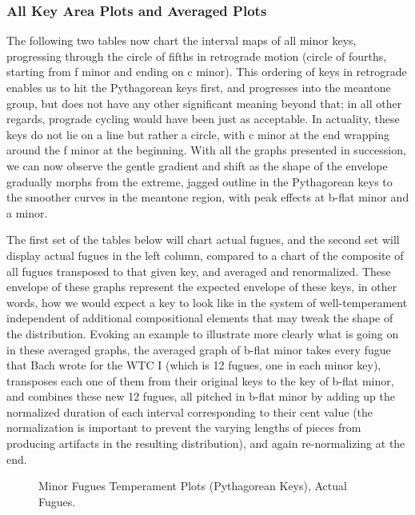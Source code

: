 \subsubsection{All Key Area Plots and Averaged
Plots}\label{all-key-area-plots-and-averaged-plots}

The following two tables now chart the interval maps of all minor keys,
progressing through the circle of fifths in retrograde motion (circle of
fourths, starting from f minor and ending on c minor). This ordering of
keys in retrograde enables us to hit the Pythagorean keys first, and
progresses into the meantone group, but does not have any other
significant meaning beyond that; in all other regards, prograde cycling
would have been just as acceptable. In actuality, these keys do not lie
on a line but rather a circle, with c minor at the end wrapping around
the f minor at the beginning. With all the graphs presented in
succession, we can now observe the gentle gradient and shift as the
shape of the envelope gradually morphs from the extreme, jagged outline
in the Pythagorean keys to the smoother curves in the meantone region,
with peak effects at b-flat minor and a minor.

The first set of the tables below will chart actual fugues, and the
second set will display actual fugues in the left column, compared to a
chart of the composite of all fugues transposed to that given key, and
averaged and renormalized. These envelope of these graphs represent the
expected envelope of these keys, in other words, how we would expect a
key to look like in the system of well-temperament independent of
additional compositional elements that may tweak the shape of the
distribution. Evoking an example to illustrate more clearly what is
going on in these averaged graphs, the averaged graph of b-flat minor
takes every fugue that Bach wrote for the WTC I (which is 12 fugues, one
in each minor key), transposes each one of them from their original keys
to the key of b-flat minor, and combines these new 12 fugues, all
pitched in b-flat minor by adding up the normalized duration of each
interval corresponding to their cent value (the normalization is
important to prevent the varying lengths of pieces from producing
artifacts in the resulting distribution), and again re-normalizing at
the end.



\begin{figure}[H]
    \begin{center}
    \caption{Minor Fugues Temperament Plots (Pythagorean Keys), Actual Fugues. }
    \end{center}
\end{figure}
    


